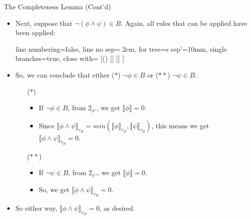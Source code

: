 \begin{frame}{The Completeness Lemma (Cont'd)}

	\begin{itemize}
		
		\item Next, suppose that $\neg (\phi\land \psi)\in B$. Again, all rules that can be applied have been applied:
		\begin{center}
				\begin{prooftree}
					{
					line numbering=false,
					line no sep= 2cm,
					for tree={s sep'=10mm},
					single branches=true,
					close with=\xmark
					}
					[\neg(\phi\land\psi) [\neg\phi ] [\neg\psi ] ]
					\end{prooftree}
				\end{center}
		
		\item So, we can conclude that either ($\ast$) $\neg\phi\in B$ or ($\ast\ast$) $\neg\psi\in B$.
		
		\begin{enumerate}
		
			\item[($\ast$)] \begin{itemize}
		
		\item If $\neg\phi\in B$, from 2$_\phi$., we get $\llbracket \phi\rrbracket=0$. 
		
		\item Since $\llbracket\phi\land \psi\rrbracket_{v_B}=min(\llbracket\phi\rrbracket_{v_B},\llbracket\psi\rrbracket_{v_B})$, this means we get $\llbracket\phi\land \psi\rrbracket_{v_B}=0$.
		
				\end{itemize}
			\end{enumerate}
			
		\begin{enumerate}
		
			\item[($\ast\ast$)] \begin{itemize}
			\item If $\neg\psi\in B$, from 2$_\psi$., we get $\llbracket \phi\rrbracket=0$. 
		
		\item So, we get $\llbracket\phi\land \psi\rrbracket_{v_B}=0$.
		
		\end{itemize}
		
		\end{enumerate}
				
		\item So either way,  $\llbracket\phi\land \psi\rrbracket_{v_B}=0$, as desired.
	
	
	\end{itemize}

\end{frame}


